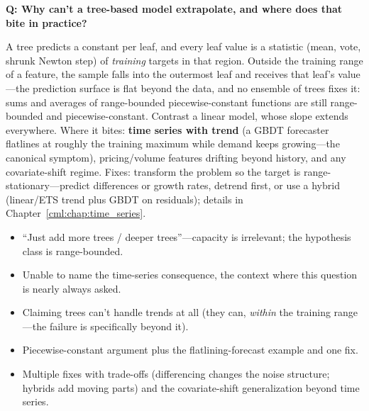 \begin{interviewq}
\textbf{Q: Why can't a tree-based model extrapolate, and where does that bite in practice?}

 \quad {} \quad \badgefreq{\freqmed}

\stronganswer

A tree predicts a constant per leaf, and every leaf value is a statistic (mean, vote, shrunk Newton step) of \textit{training} targets in that region. Outside the training range of a feature, the sample falls into the outermost leaf and receives that leaf's value---the prediction surface is flat beyond the data, and no ensemble of trees fixes it: sums and averages of range-bounded piecewise-constant functions are still range-bounded and piecewise-constant. Contrast a linear model, whose slope extends everywhere. Where it bites: \textbf{time series with trend} (a GBDT forecaster flatlines at roughly the training maximum while demand keeps growing---the canonical symptom), pricing/volume features drifting beyond history, and any covariate-shift regime. Fixes: transform the problem so the target is range-stationary---predict differences or growth rates, detrend first, or use a hybrid (linear/ETS trend plus GBDT on residuals); details in Chapter~\ref{cml:chap:time_series}.

\redflags
\begin{itemize}
    \item ``Just add more trees / deeper trees''---capacity is irrelevant; the hypothesis class is range-bounded.
    \item Unable to name the time-series consequence, the context where this question is nearly always asked.
    \item Claiming trees can't handle trends at all (they can, \textit{within} the training range---the failure is specifically beyond it).
\end{itemize}


\goodgreat
\begin{itemize}
    \item {} Piecewise-constant argument plus the flatlining-forecast example and one fix.
    \item {} Multiple fixes with trade-offs (differencing changes the noise structure; hybrids add moving parts) and the covariate-shift generalization beyond time series.
\end{itemize}

\end{interviewq}

